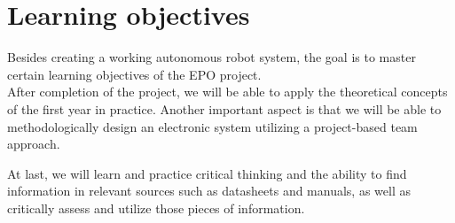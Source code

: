 \section{Learning objectives}
Besides creating a working autonomous robot system, the goal is to master certain learning objectives of the EPO project.\\ 
After completion of the project, we will be able to apply the theoretical concepts of the first year in practice. Another important aspect is that we will be able to methodologically design an electronic system utilizing a project-based team approach.

At last, we will learn and practice critical thinking and the ability to find information in relevant sources such as datasheets and manuals, as well as critically assess and utilize those pieces of information.


